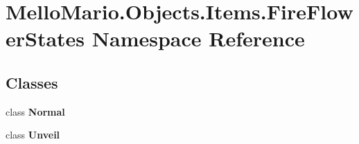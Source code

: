 \section{Mello\+Mario.\+Objects.\+Items.\+Fire\+Flower\+States Namespace Reference}
\label{namespaceMelloMario_1_1Objects_1_1Items_1_1FireFlowerStates}
\subsection*{Classes}
\begin{DoxyCompactItemize}
\item 
class \textbf{ Normal}
\item 
class \textbf{ Unveil}
\end{DoxyCompactItemize}
